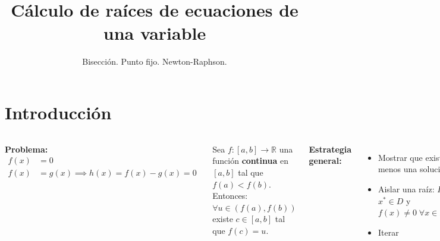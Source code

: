 \documentclass[9pt, aspectratio=169]{beamer}
\title{Cálculo de raíces de ecuaciones de una variable}
\subtitle{Bisección. Punto fijo. Newton-Raphson.}
\begin{document}
\maketitle

\section{Introducción}

\begin{frame}
	\begin{columns}[t]
		\cx
		\textbf{Problema:}
		\begin{equation*}
			\begin{split}
				f(x) & = 0                                    \\
				f(x) & = g(x) \implies h(x) = f(x) - g(x) = 0
			\end{split}
		\end{equation*}

		\begin{theorem}
			Sea $f: [a, b] \rightarrow \mathbb{R}$ una función \textbf{continua} en $[a, b]$ tal que $f(a) < f(b)$. Entonces: $\forall u \in (f(a), f(b))$ existe $c \in [a, b]$ tal que $f(c) = u$.
		\end{theorem}
		\pause

		\textbf{Estrategia general:} %
		\begin{itemize}
			\item Mostrar que existe al menos una solución ($x^*$)
			\item Aislar una raíz: $D \subset \mathbb{R}$, $x^* \in D$ y $f(x) \neq 0 \; \forall x \in D \setminus \{ x^* \}$
			\item Iterar
		\end{itemize}
		\pause


\end{columns}
\end{frame}
\end{document}
